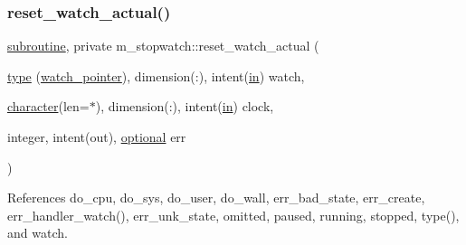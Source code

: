 \subsubsection{\texorpdfstring{reset\+\_\+watch\+\_\+actual()}{reset\_watch\_actual()}}
{\footnotesize\ttfamily \hyperlink{M__stopwatch_83_8txt_acfbcff50169d691ff02d4a123ed70482}{subroutine}, private m\+\_\+stopwatch\+::reset\+\_\+watch\+\_\+actual (\begin{DoxyParamCaption}\item[{\hyperlink{stop__watch_83_8txt_a70f0ead91c32e25323c03265aa302c1c}{type} (\hyperlink{structm__stopwatch_1_1watch__pointer}{watch\+\_\+pointer}), dimension(\+:), intent(\hyperlink{M__journal_83_8txt_afce72651d1eed785a2132bee863b2f38}{in})}]{watch,  }\item[{\hyperlink{option__stopwatch_83_8txt_abd4b21fbbd175834027b5224bfe97e66}{character}(len=$\ast$), dimension(\+:), intent(\hyperlink{M__journal_83_8txt_afce72651d1eed785a2132bee863b2f38}{in})}]{clock,  }\item[{integer, intent(out), \hyperlink{option__stopwatch_83_8txt_aa4ece75e7acf58a4843f70fe18c3ade5}{optional}}]{err }\end{DoxyParamCaption})\hspace{0.3cm}{\ttfamily [private]}}



References do\+\_\+cpu, do\+\_\+sys, do\+\_\+user, do\+\_\+wall, err\+\_\+bad\+\_\+state, err\+\_\+create, err\+\_\+handler\+\_\+watch(), err\+\_\+unk\+\_\+state, omitted, paused, running, stopped, type(), and watch.

\mbox{\label{namespacem__stopwatch_a05ff195ab84cacf71bbb2c646c562888}} 
